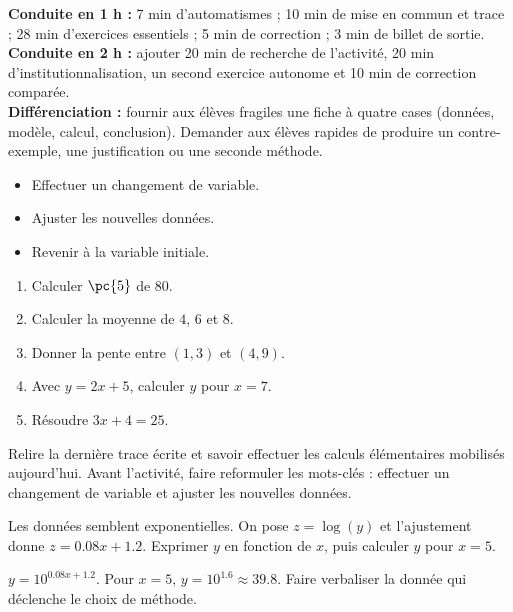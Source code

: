 \ifmxteacher
\begin{method}
\textbf{Conduite en 1 h :} 7 min d'automatismes ; 10 min de mise en commun et trace ; 28 min d'exercices essentiels ; 5 min de correction ; 3 min de billet de sortie.\\
\textbf{Conduite en 2 h :} ajouter 20 min de recherche de l'activité, 20 min d'institutionnalisation, un second exercice autonome et 10 min de correction comparée.\\
\textbf{Différenciation :} fournir aux élèves fragiles une fiche à quatre cases (données, modèle, calcul, conclusion). Demander aux élèves rapides de produire un contre-exemple, une justification ou une seconde méthode.
\end{method}
\fi
{}
\begin{objectives}\begin{itemize}\item Effectuer un changement de variable.\item Ajuster les nouvelles données.\item Revenir à la variable initiale.\end{itemize}\end{objectives}
\begin{fluency}\begin{enumerate}\item Calculer $\pc{5}$ de $80$. \item Calculer la moyenne de $4$, $6$ et $8$. \item Donner la pente entre $(1,3)$ et $(4,9)$. \item Avec $y=2x+5$, calculer $y$ pour $x=7$. \item Résoudre $3x+4=25$. \end{enumerate}\end{fluency}
\begin{prerequisites}Relire la dernière trace écrite et savoir effectuer les calculs élémentaires mobilisés aujourd'hui. Avant l'activité, faire reformuler les mots-clés : effectuer un changement de variable et ajuster les nouvelles données.\end{prerequisites}

\begin{activity}
Les données semblent exponentielles. On pose $z=\log(y)$ et l'ajustement donne $z=\num{0,08}x+\num{1,2}$. Exprimer $y$ en fonction de $x$, puis calculer $y$ pour $x=5$.

\end{activity}
\begin{solution}$y=10^{\num{0,08}x+\num{1,2}}$. Pour $x=5$, $y=10^{\num{1,6}}\approx\num{39,8}$. Faire verbaliser la donnée qui déclenche le choix de méthode.\end{solution}

